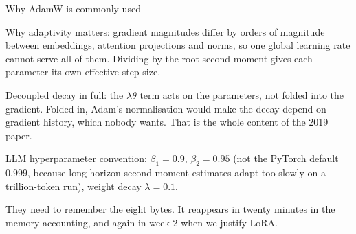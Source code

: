 \documentclass[aspectratio=169,10pt]{beamer}
\begin{document}
\begin{frame}[shrink=12]{Why AdamW is commonly used}
{  Why adaptivity matters: gradient magnitudes differ by orders of magnitude
  between embeddings, attention projections and norms, so one global learning
  rate cannot serve all of them. Dividing by the root second moment gives each
  parameter its own effective step size.

  Decoupled decay in full: the $\lambda\theta$ term acts on the parameters, not
  folded into the gradient. Folded in, Adam's normalisation would make the decay
  depend on gradient history, which nobody wants. That is the whole content of
  the 2019 paper.

  LLM hyperparameter convention: $\beta_1 = 0.9$, $\beta_2 = 0.95$ (not the
  PyTorch default $0.999$, because long-horizon second-moment estimates adapt too
  slowly on a trillion-token run), weight decay $\lambda = 0.1$.

  They need to remember the eight bytes. It reappears in twenty minutes in the
  memory accounting, and again in week 2 when we justify LoRA.}
\end{frame}
\end{document}
